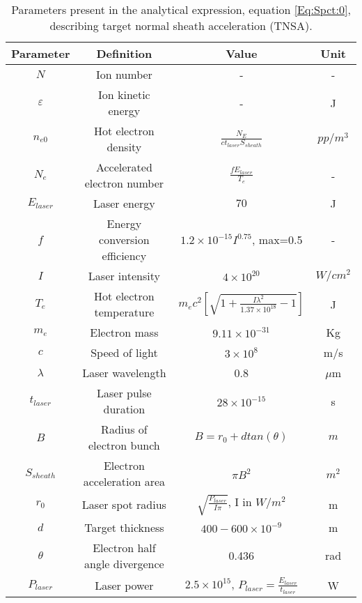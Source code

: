 \begin{table} 
  \caption{
    Parameters present in the analytical expression,
    equation \ref{Eq:Spct:0}, describing target normal sheath
    acceleration (TNSA).
  }
  \label{table:EnergySpectrumParameters}
  \begin{center}
    \begin{tabular}{c c c c}
      \hline
      \textbf{Parameter} & \textbf{Definition} & \textbf{Value} & \textbf{Unit} \\ [1ex] 
      \hline \hline
      $N$ & Ion number & - & - \\ 
      $\varepsilon$ & Ion kinetic energy & - & J \\  
      $n_{e0}$ & Hot electron density & $\frac{N_{E}}{c t_{laser} S_{sheath}}$ & $pp/m^3$ \\ 
      $N_{e}$ & Accelerated electron number & $\frac{f E_{laser}}{T_e}$ & - \\ 
      $E_{laser}$ & Laser energy & $70$ & J \\  
      $f$ & Energy conversion efficiency & $1.2 \times 10^{-15} I^{0.75}$, max=0.5  & - \\   %
      $I$ & Laser intensity & $4 \times 10^{20}$ & $W/cm^{2}$ \\ 
      $T_{e}$ & Hot electron temperature & $m_{e} c^{2} [\sqrt{1 + \frac{I \lambda^{2}}{1.37 \times 10^{18}} -1} ]$ & J \\ 
      $m_{e}$ & Electron mass & $9.11 \times 10^{-31}$ & Kg \\ 
      $c$ & Speed of light & $3 \times 10^{8}$ & m/s \\ 
      $\lambda$ & Laser wavelength & 0.8 & $\mu$m \\  
      $t_{laser}$ & Laser pulse duration & $28 \times 10^{-15}$  & s \\  
      $B$ & Radius of electron bunch & $B=r_{0} + d tan(\theta)$ & $m$ \\ 
      $S_{sheath}$ & Electron acceleration area & $\pi B^{2}$ & $m^{2}$ \\ 
      $r_{0}$ & Laser spot radius & $\sqrt{\frac{P_{laser}}{I \pi}}$, I in $W/m^{2}$ & m \\  
      $d$ & Target thickness & $400-600 \times 10^{-9}$ & m \\  
      $\theta$ & Electron half angle divergence & 0.436 & rad \\  
      $P_{laser}$ & Laser power & $2.5 \times 10^{15}$, $P_{laser}=\frac{E_{laser}}{t_{laser}}$ & W \\  

\end{tabular}
\end{center}
\end{table}
